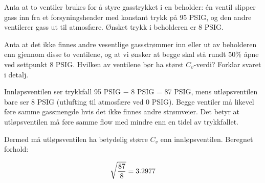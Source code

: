 

Anta at to ventiler brukes for å styre gasstrykket i en beholder: én ventil slipper gass inn fra et forsyningsheader med konstant trykk på 95 PSIG, og den andre ventilerer gass ut til atmosfære. Ønsket trykk i beholderen er 8 PSIG.

\vskip 10pt

Anta at det ikke finnes andre vesentlige gassstrømmer inn eller ut av beholderen enn gjennom disse to ventilene, og at vi ønsker at begge skal stå rundt 50\% åpne ved settpunkt 8 PSIG. Hvilken av ventilene bør ha størst $C_v$-verdi? Forklar svaret i detalj.







Innløpsventilen ser trykkfall 95 PSIG $-$ 8 PSIG = 87 PSIG, mens utløpsventilen bare ser 8 PSIG (utlufting til atmosfære ved 0 PSIG). Begge ventiler må likevel føre samme gassmengde hvis det ikke finnes andre strømveier. Det betyr at utløpsventilen må føre samme flow med mindre enn en tidel av trykkfallet.

\vskip 10pt

Dermed må utløpsventilen ha betydelig større $C_v$ enn innløpsventilen. Beregnet forhold:

$$\sqrt{87 \over 8} = 3.2977$$









